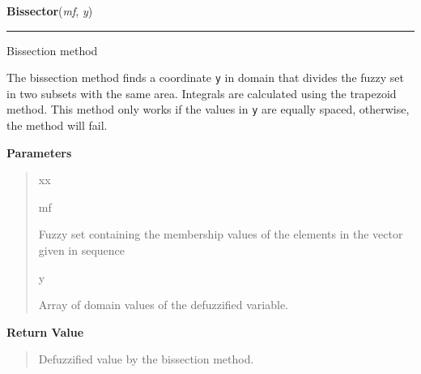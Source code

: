     \vspace{0.5ex}

    \begin{boxedminipage}{\textwidth}

    \raggedright \textbf{Bissector}(\textit{mf}, \textit{y})

    \vspace{-1.5ex}

    \rule{\textwidth}{0.5\fboxrule}

Bissection method

The bissection method finds a coordinate \texttt{y} in domain that divides the
fuzzy set in two subsets with the same area. Integrals are calculated using
the trapezoid method. This method only works if the values in \texttt{y} are
equally spaced, otherwise, the method will fail.
    \vspace{1ex}

      \textbf{Parameters}
      \begin{quote}
        \begin{Ventry}{xx}

          \item[mf]


Fuzzy set containing the membership values of the elements in the
vector given in sequence
          \item[y]


Array of domain values of the defuzzified variable.
        \end{Ventry}

      \end{quote}

    \vspace{1ex}

      \textbf{Return Value}
      \begin{quote}

Defuzzified value by the bissection method.
      \end{quote}

    \vspace{1ex}

    \end{boxedminipage}

    \label{peach:fuzzy:defuzzy:SmallestOfMaxima}

    \vspace{0.5ex}

